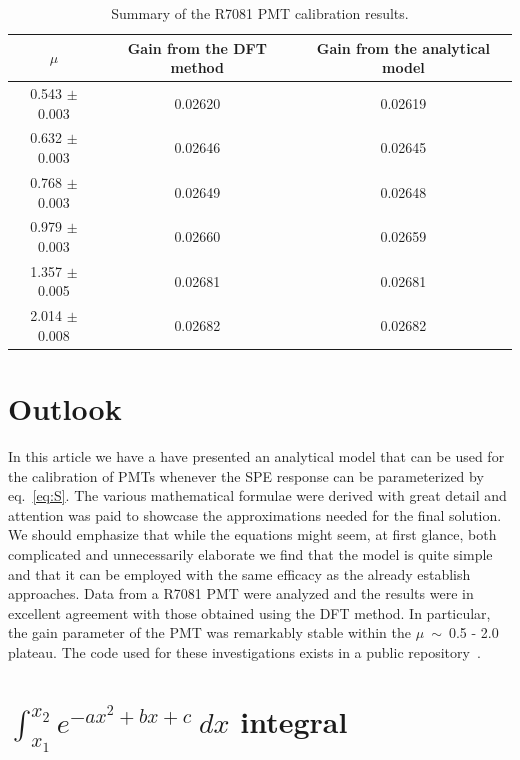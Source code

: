 \documentclass[a4paper,11pt]{article}
\begin{document}
\begin{table}[t!]
\centering
\begin{tabular}{| c  || c | c |}
\hline
$\mu$                      & Gain from the DFT method  	       & Gain from the analytical model           \\[0.6ex] \hline\hline
0.543 $\pm$ 0.003  & 0.02620					       & 0.02619 						     				\\
0.632 $\pm$ 0.003  & 0.02646					       & 0.02645					  	    				\\
0.768 $\pm$ 0.003  & 0.02649					       & 0.02648					  	    				\\
0.979 $\pm$ 0.003  & 0.02660					       & 0.02659					    	    				\\
1.357 $\pm$ 0.005  & 0.02681					       & 0.02681					  	    				\\
2.014 $\pm$ 0.008  & 0.02682					       & 0.02682				  			
\\[0.6ex] \hline\hline
\end{tabular}
\caption{Summary of the R7081 PMT calibration results.}
\label{tab:g}
\end{table}



\section{Outlook}
\label{sec:outro}
%
In this article we have a have presented an analytical model that can be used for the calibration of PMTs whenever the SPE response can be parameterized by eq.~\ref{eq:S}.  
The various mathematical formulae were derived with great detail and attention was paid to showcase the approximations needed for the final solution. 
We should emphasize that while the equations might seem, at first glance, both complicated and unnecessarily elaborate we find that the model is quite simple 
and that it can be employed with the same efficacy as the already establish approaches. 
Data from a R7081 PMT were analyzed and the results were in excellent agreement with those obtained using the DFT method. 
In particular, the gain parameter of the PMT was remarkably stable within the $\mu$~$\sim$~0.5 - 2.0 plateau. 
The code used for these investigations exists in a public repository~\cite{git}.  




\appendix
%

\section{$\int_{ x_1 }^{x_2}  e^{-a x^2 +b x +c } \ dx$ integral}
\label{app:int}
%
\end{document}

